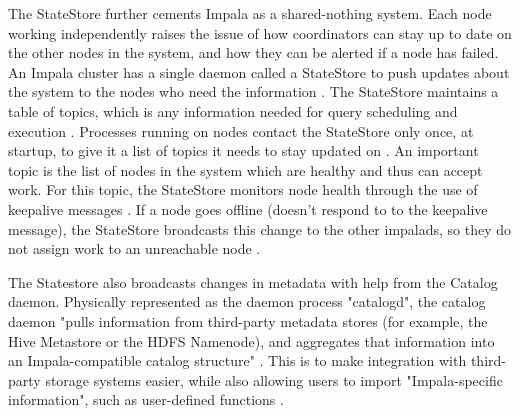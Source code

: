 \documentclass[onecolumn, draftclsnofoot,10pt, compsoc]{IEEEtran}
\begin{document}
The StateStore further cements Impala as a shared-nothing system. Each node working independently raises the issue of how coordinators can stay up to date on the other nodes in the system, and how they can be alerted if a node has failed.
An Impala cluster has a single daemon called a StateStore to push updates about the system to the nodes who need the information \cite{Impala}.
The StateStore maintains a table of topics, which is any information needed for query scheduling and execution \cite{ImpalaGuide}.
Processes running on nodes contact the StateStore only once, at startup, to give it a list of topics it needs to stay updated on \cite{Impala}. 
An important topic is the list of nodes in the system which are healthy and thus can accept work. 
For this topic, the StateStore monitors node health through the use of keepalive messages \cite{Impala}.
If a node goes offline (doesn’t respond to to the keepalive message), the StateStore broadcasts this change to the other impalads, so they do not assign work to an unreachable node \cite{ImpalaGuide}.

The Statestore also broadcasts changes in metadata with help from the Catalog daemon.
Physically represented as the daemon process "catalogd", the catalog daemon "pulls information from third-party metadata stores (for example, the Hive Metastore or the HDFS Namenode), and aggregates that information into an Impala-compatible catalog structure" \cite{Impala}. 
This is to make integration with third-party storage systems easier, while also allowing users to import "Impala-specific information", such as user-defined functions \cite{Impala}.
	
\nocite{*}


\end{document}
